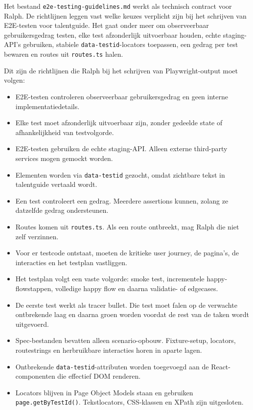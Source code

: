 Het bestand \texttt{e2e-testing-guidelines.md} werkt als technisch contract voor Ralph. De richtlijnen leggen vast welke keuzes verplicht zijn bij het schrijven van E2E-testen voor talentguide. Het gaat onder meer om observeerbaar gebruikersgedrag testen, elke test afzonderlijk uitvoerbaar houden, echte staging-API's gebruiken, stabiele \texttt{data-testid}-locators toepassen, een gedrag per test bewaren en routes uit \texttt{routes.ts} halen.

Dit zijn de richtlijnen die Ralph bij het schrijven van Playwright-output moet volgen:

\begin{itemize}
    \item E2E-testen controleren observeerbaar gebruikersgedrag en geen interne implementatiedetails.
    \item Elke test moet afzonderlijk uitvoerbaar zijn, zonder gedeelde state of afhankelijkheid van testvolgorde.
    \item E2E-testen gebruiken de echte staging-API. Alleen externe third-party services mogen gemockt worden.
    \item Elementen worden via \texttt{data-testid} gezocht, omdat zichtbare tekst in talentguide vertaald wordt.
    \item Een test controleert een gedrag. Meerdere assertions kunnen, zolang ze datzelfde gedrag ondersteunen.
    \item Routes komen uit \texttt{routes.ts}. Als een route ontbreekt, mag Ralph die niet zelf verzinnen.
    \item Voor er testcode ontstaat, moeten de kritieke user journey, de pagina's, de interacties en het testplan vastliggen.
    \item Het testplan volgt een vaste volgorde: smoke test, incrementele happy-flowstappen, volledige happy flow en daarna validatie- of edgecases.
    \item De eerste test werkt als tracer bullet. Die test moet falen op de verwachte ontbrekende laag en daarna groen worden voordat de rest van de taken wordt uitgevoerd.
    \item Spec-bestanden bevatten alleen scenario-opbouw. Fixture-setup, locators, routestrings en herbruikbare interacties horen in aparte lagen.
    \item Ontbrekende \texttt{data-testid}-attributen worden toegevoegd aan de React-componenten die effectief DOM renderen.
    \item Locators blijven in Page Object Models staan en gebruiken \texttt{page.getByTestId()}. Tekstlocators, CSS-klassen en XPath zijn uitgesloten.

\end{itemize}
